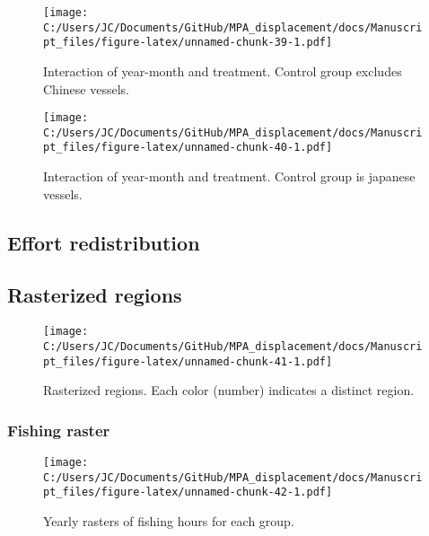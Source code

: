 \documentclass[11pt,]{article}
\begin{document}
\begin{figure}
\centering
\texttt{[image: C:/Users/JC/Documents/GitHub/MPA\_displacement/docs/Manuscript\_files/figure-latex/unnamed-chunk-39-1.pdf]}
\caption{\label{fig:unnamed-chunk-39}\label{fig:ym3}Interaction of
year-month and treatment. Control group excludes Chinese vessels.}
\end{figure}

\begin{figure}
\centering
\texttt{[image: C:/Users/JC/Documents/GitHub/MPA\_displacement/docs/Manuscript\_files/figure-latex/unnamed-chunk-40-1.pdf]}
\caption{\label{fig:unnamed-chunk-40}\label{fig:ym4}Interaction of
year-month and treatment. Control group is japanese vessels.}
\end{figure}

\hypertarget{effort-redistribution}{%
\subsection{Effort redistribution}\label{effort-redistribution}}

\hypertarget{rasterized-regions}{%
\subsection{Rasterized regions}\label{rasterized-regions}}

\begin{figure}
\centering
\texttt{[image: C:/Users/JC/Documents/GitHub/MPA\_displacement/docs/Manuscript\_files/figure-latex/unnamed-chunk-41-1.pdf]}
\caption{\label{fig:unnamed-chunk-41}\label{fig:raster_rgn}Rasterized
regions. Each color (number) indicates a distinct region.}
\end{figure}

\hypertarget{fishing-raster}{%
\subsubsection{Fishing raster}\label{fishing-raster}}

\begin{figure}
\centering
\texttt{[image: C:/Users/JC/Documents/GitHub/MPA\_displacement/docs/Manuscript\_files/figure-latex/unnamed-chunk-42-1.pdf]}
\caption{\label{fig:unnamed-chunk-42}\label{fig:fishing_raster_full}Yearly
rasters of fishing hours for each group.}
\end{figure}

\clearpage
\end{document}
